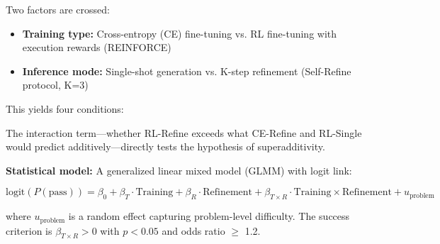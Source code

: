 
Two factors are crossed:

\begin{itemize}
\item \textbf{Training type:} Cross-entropy (CE) fine-tuning vs. RL fine-tuning with execution rewards (REINFORCE)
\item \textbf{Inference mode:} Single-shot generation vs. K-step refinement (Self-Refine protocol, K=3)
\end{itemize}

This yields four conditions:

\begin{table}[htbp]
\centering
{}
\end{table}

The interaction term---whether RL-Refine exceeds what CE-Refine and RL-Single would predict additively---directly tests the hypothesis of superadditivity.

\textbf{Statistical model:} A generalized linear mixed model (GLMM) with logit link:

$$\text{logit}(P(\text{pass})) = \beta_0 + \beta_T \cdot \text{Training} + \beta_R \cdot \text{Refinement} + \beta_{T \times R} \cdot \text{Training} \times \text{Refinement} + u_{\text{problem}}$$

where $u_{\text{problem}}$ is a random effect capturing problem-level difficulty. The success criterion is $\beta_{T \times R} > 0$ with $p < 0.05$ and odds ratio $\geq$ 1.2.
